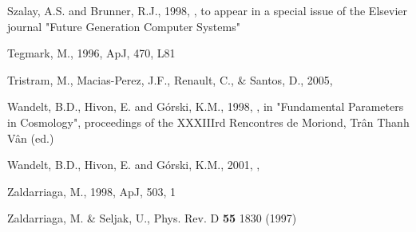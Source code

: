 \documentclass[12pt,twoside]{article}
\begin{document}
\begin{thebibliography}{99}
Szalay, A.S. and Brunner, R.J., 1998, 
, to appear in 
a special issue of the Elsevier journal "Future Generation Computer Systems"

Tegmark, M., 1996, ApJ, 470, L81

Tristram, M., Macias-Perez, J.F., Renault, C., \& Santos, D., 2005, 

Wandelt, B.D., Hivon, E. and G\'orski, K.M., 1998, 
, in
 "Fundamental Parameters in Cosmology", proceedings of the XXXIIIrd Rencontres
de Moriond, Tr{\^a}n Thanh V{\^a}n (ed.)

Wandelt, B.D., Hivon, E. and G\'orski, K.M., 2001, 
,

 
Zaldarriaga, M., 1998, ApJ, 503, 1

Zaldarriaga, M. \& Seljak, U., Phys. Rev. D \textbf{55} 1830 (1997)


\end{thebibliography}
\end{document}
